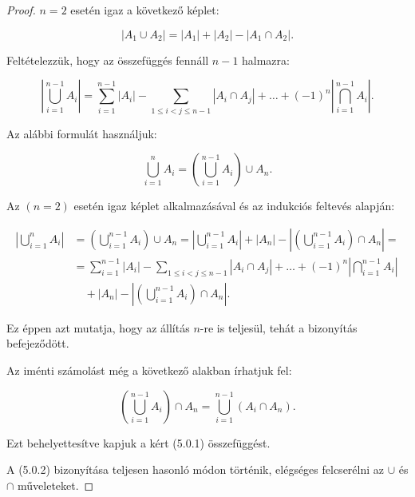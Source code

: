 \begin{proof}
$n=2$ esetén igaz a következő képlet:

\begin{equation}
|A_{1}\cup A_{2}|=|A_{1}|+|A_{2}|-|A_{1}\cap A_{2}|.
\end{equation}

Feltételezzük, hogy az összefüggés fennáll $n-1$ halmazra:

\begin{equation}
\left|\bigcup_{i=1}^{n-1}A_{i}\right|=\sum_{i=1}^{n-1}|A_{i}|-\sum_{1\leq i<j\leq n-1}|A_{i}\cap A_{j}|+\dots+(-1)^{n}\left|\bigcap_{i=1}^{n-1}A_{i}\right|.
\end{equation}

Az alábbi formulát használjuk:

\begin{equation}
\bigcup_{i=1}^{n}A_{i}=\left(\bigcup_{i=1}^{n-1}A_{i}\right)\cup A_{n}.
\end{equation}

Az $(n=2)$ esetén igaz képlet alkalmazásával és az indukciós feltevés
alapján:

\begin{align*}
\left|\bigcup_{i=1}^{n}A_{i}\right| & =\left(\bigcup_{i=1}^{n-1}A_{i}\right)\cup A_{n}=\left|\bigcup_{i=1}^{n-1}A_{i}\right|+|A_{n}|-\left|\left(\bigcup_{i=1}^{n-1}A_{i}\right)\cap A_{n}\right|=\\
 & =\sum_{i=1}^{n-1}|A_{i}|-\sum_{1\leq i<j\leq n-1}|A_{i}\cap A_{j}|+\dots+(-1)^{n}\left|\bigcap_{i=1}^{n-1}A_{i}\right|\\
 & \quad+|A_{n}|-\left|\left(\bigcup_{i=1}^{n-1}A_{i}\right)\cap A_{n}\right|.
\end{align*}

Ez éppen azt mutatja, hogy az állítás $n$-re is teljesül, tehát a
bizonyítás befejeződött.

Az iménti számolást még a következő alakban írhatjuk fel:

\begin{equation}
\left(\bigcup_{i=1}^{n-1}A_{i}\right)\cap A_{n}=\bigcup_{i=1}^{n-1}(A_{i}\cap A_{n}).
\end{equation}

Ezt behelyettesítve kapjuk a kért (5.0.1) összefüggést.

A (5.0.2) bizonyítása teljesen hasonló módon történik, elégséges felcserélni
az $\cup$ és $\cap$ műveleteket. 
\end{proof}
